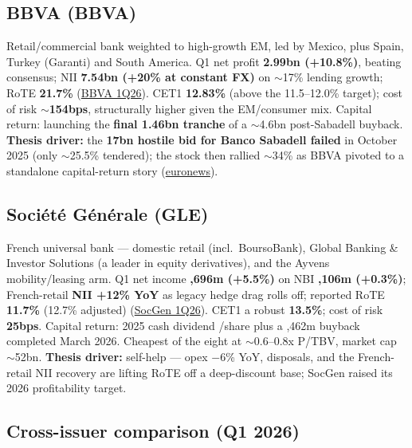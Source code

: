 \documentclass[10pt,a4paper]{article}
\begin{document}
\subsection*{BBVA (BBVA)}
Retail/commercial bank weighted to high-growth EM, led by Mexico, plus Spain, Turkey (Garanti) and South America. Q1 net profit \textbf{\texteuro2.99bn (+10.8\%)}, beating consensus; NII \textbf{\texteuro7.54bn (+20\% at constant FX)} on $\sim$17\% lending growth; RoTE \textbf{21.7\%} (\href{https://www.bbva.com/en/economy-and-finance/earnings-1q2026/}{BBVA 1Q26}). CET1 \textbf{12.83\%} (above the 11.5--12.0\% target); cost of risk $\sim$\textbf{154bps}, structurally higher given the EM/consumer mix. Capital return: launching the \textbf{final \texteuro1.46bn tranche} of a $\sim$\texteuro4.6bn post-Sabadell buyback. \textbf{Thesis driver:} the \textbf{\texteuro17bn hostile bid for Banco Sabadell failed} in October 2025 (only $\sim$25.5\% tendered); the stock then rallied $\sim$34\% as BBVA pivoted to a standalone capital-return story (\href{https://www.euronews.com/business/2025/10/17/bbva-fails-in-17bn-takeover-battle-for-smaller-spanish-rival-sabadell}{euronews}).

\subsection*{Soci\'et\'e G\'en\'erale (GLE)}
French universal bank --- domestic retail (incl.\ BoursoBank), Global Banking \& Investor Solutions (a leader in equity derivatives), and the Ayvens mobility/leasing arm. Q1 net income \textbf{,696m (+5.5\%)} on NBI \textbf{,106m (+0.3\%)}; French-retail \textbf{NII +12\% YoY} as legacy hedge drag rolls off; reported RoTE \textbf{11.7\%} (12.7\% adjusted) (\href{https://www.globenewswire.com/news-release/2026/04/30/3284407/0/en/societe-generale-first-quarter-2026-earnings.html}{SocGen 1Q26}). CET1 a robust \textbf{13.5\%}; cost of risk \textbf{25bps}. Capital return: 2025 cash dividend /share plus a ,462m buyback completed March 2026. Cheapest of the eight at $\sim$0.6--0.8x P/TBV, market cap $\sim$\texteuro52bn. \textbf{Thesis driver:} self-help --- opex $-$6\% YoY, disposals, and the French-retail NII recovery are lifting RoTE off a deep-discount base; SocGen raised its 2026 profitability target.

\subsection*{Cross-issuer comparison (Q1 2026)}
\end{document}
